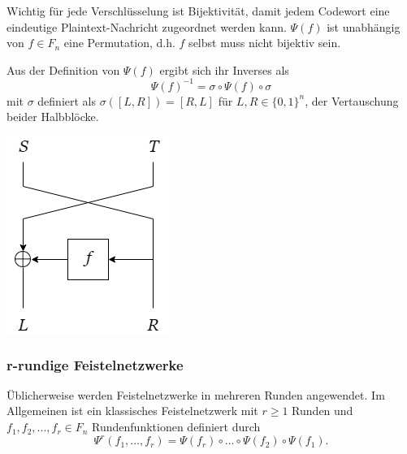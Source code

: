 \documentclass[course=erap]{aspdoc}
\begin{document}
Wichtig für jede Verschlüsselung ist Bijektivität, damit jedem Codewort eine eindeutige Plaintext-Nachricht zugeordnet werden kann. $\Psi(f)$ ist unabhängig von $f \in F_n$ eine Permutation, d.h. $f$ selbst muss nicht bijektiv sein.\cite[p.12]{nachef}\bigbreak

Aus der Definition von $\Psi(f)$ ergibt sich ihr Inverses als
\[
    \Psi(f)^{-1} = \sigma \circ \Psi(f) \circ \sigma
\]
mit $\sigma$ definiert als $\sigma([L, R]) = [R, L]$ für $L, R \in \{0, 1\}^n$, der Vertauschung beider Halbblöcke.\cite[p.12]{nachef}

\begin{center}
    \includegraphics[scale=0.5]{img/1_round_feistel_cipher_dec.png}
\end{center}

\subsubsection{r-rundige Feistelnetzwerke}

Üblicherweise werden Feistelnetzwerke in mehreren Runden angewendet. Im Allgemeinen ist ein klassisches Feistelnetzwerk mit $r \geq 1$ Runden und $f_1, f_2, ..., f_r \in F_n$ Rundenfunktionen definiert durch
\[
    \Psi^r(f_1, ..., f_r) = \Psi(f_r) \circ ... \circ \Psi(f_2) \circ \Psi(f_1).
\]\cite[p.12]{nachef}
\end{document}
